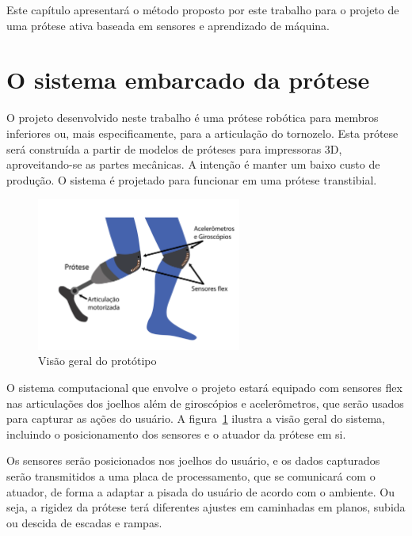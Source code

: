 Este capítulo apresentará o método proposto por este trabalho para o projeto de uma prótese ativa baseada em sensores e aprendizado de máquina.

\section{O sistema embarcado da prótese}
\label{sec:metodo_protese}

O projeto desenvolvido neste trabalho é uma prótese robótica para membros inferiores ou, mais especificamente, para a articulação do tornozelo. Esta prótese será construída a partir de modelos de próteses para impressoras 3D, aproveitando-se as partes mecânicas. A intenção é manter um baixo custo de produção. O sistema é projetado para funcionar em uma prótese transtibial.

\begin{figure}[h]
	\caption{\label{fig:big_picture}Visão geral do protótipo}
	\begin{center}
	    \includegraphics[width=0.6\textwidth]{resources/big_picture}
	\end{center}
\end{figure}

O sistema computacional que envolve o projeto estará equipado com sensores flex nas articulações dos joelhos além de giroscópios e acelerômetros, que serão usados para capturar as ações do usuário. A figura~\ref{fig:big_picture} ilustra a visão geral do sistema, incluindo o posicionamento dos sensores e o atuador da prótese em si.

Os sensores serão posicionados nos joelhos do usuário, e os dados capturados serão transmitidos a uma placa de processamento, que se comunicará com o atuador, de forma a adaptar a pisada do usuário de acordo com o ambiente. Ou seja, a rigidez da prótese terá diferentes ajustes em caminhadas em planos, subida ou descida de escadas e rampas.

